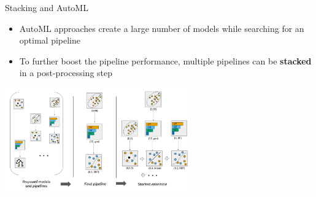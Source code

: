 \begin{vbframe}{Stacking and AutoML}
    \begin{itemize}
        \item AutoML approaches create a large number of models while searching for an optimal pipeline
        \item To further boost the pipeline performance, multiple pipelines can be \textbf{stacked} in a post-processing step
    \end{itemize}
    \medskip
    
    \begin{center}
        \includegraphics[height=4.5cm]{figure_man/stacking.png}
    \end{center}
\end{vbframe}







